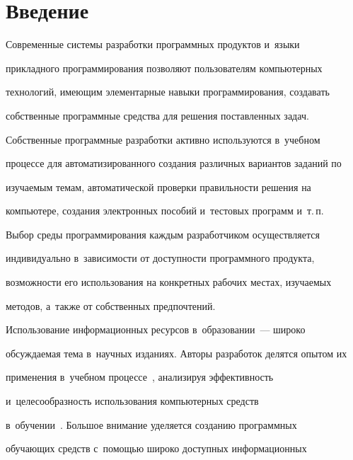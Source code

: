       




  


\section{Введение}





  Современные системы разработки программных продуктов и~языки 


прикладного программирования позволяют пользователям компьютерных 


технологий, име\-ющим элементарные навыки программирования, создавать 


собственные программные средства для решения по\-став\-лен\-ных задач. 


Собственные программные разработки активно используются в~учебном 


процессе для автоматизированного создания различных вариантов заданий по 


изучаемым темам, автоматической проверки пра\-виль\-ности решения на 


компьютере, создания электронных пособий и~тестовых программ и~т.\,п. 


Выбор среды программирования каждым разработчиком осуществляется 


индивидуально в~за\-ви\-си\-мости от доступности программного продукта, 


воз\-мож\-ности его использования на конкретных рабочих местах, изуча\-емых 


методов, а~так\-же от собственных предпочтений.


  


  Использование информационных ресурсов в~образовании~--- широко 


об\-суж\-да\-емая тема в~научных изданиях. Авторы разработок делятся опытом их 


применения в~учеб\-ном процессе~\cite{1-a}, анализируя эффективность 


и~целесообразность использования компьютерных средств  


в~обуче\-нии~\cite{2-a}. Большое внимание уделяется созданию программных 


обуча\-ющих средств с~по\-мощью широко доступных информационных 


